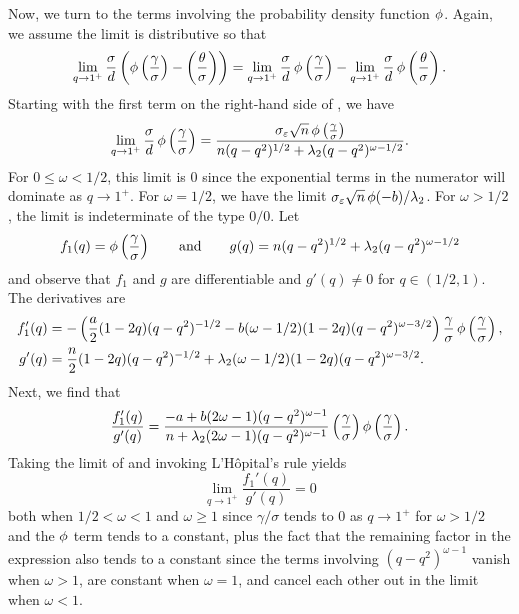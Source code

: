 Now, we turn to the terms involving the probability density function \(\operatorname{\phi}\). Again, we
assume the limit is distributive so that
\begin{equation}
  \label{eq:eval-qlimit-pdf-weighted}
  \lim_{q \rightarrow 1^+} \frac{\sigma}{d} \left(\operatorname{\phi}\left(\frac{\gamma}{\sigma}\right) - \left(\frac{\theta}{\sigma}\right)\right) =
  \lim_{q\rightarrow 1^+}\frac{\sigma}{d} \operatorname{\phi} \left(\frac{\gamma}{\sigma}\right) - \lim_{q \rightarrow 1^+} \frac{\sigma}{d} \operatorname{\phi} \left(\frac{\theta}{\sigma}\right).
\end{equation}
%
Starting with the first term on the right-hand side of ,
we have
%
\[
  \lim_{q\rightarrow 1^+}\frac{\sigma}{d} \operatorname{\phi} \left(\frac{\gamma}{\sigma}\right) =
  \frac{\sigma_\varepsilon \sqrt{n} \operatorname{\phi}\left(\frac{\gamma}{\sigma}\right)}{n(q-q^2)^{1/2} + \lambda_2(q-q^2)^{\omega - 1/2}}.
\]
For \(0 \leq \omega < 1/2\), this limit is 0 since the exponential terms in the numerator
will dominate as \(q \rightarrow 1^+\). For \(\omega = 1/2\), we have the limit
\(\sigma_\varepsilon\sqrt{n} \operatorname{\phi}(-b)/\lambda_2\). For \(\omega > 1/2\), the limit is
indeterminate of the type \(0/0\). Let
\begin{equation*}
  f_1(q) = \operatorname{\phi}\left(\frac{\gamma}{\sigma}\right)
  \qquad\text{and}\qquad
  g(q) = n(q-q^2)^{1/2} + \lambda_2(q-q^2)^{\omega - 1/2}
\end{equation*}
%
and observe that \(f_1\) and \(g\) are differentiable and \(g'(q) \neq 0 \) for \(q \in
(1/2, 1)\). The derivatives are
%
\begin{align*}
  f_1'(q) & = -\left(\frac{a}{2}(1-2q)(q-q^2)^{-1/2} - b(\omega - 1/2)(1-2q)(q-q^2)^{\omega - 3/2}\right) \frac{\gamma}{\sigma} \operatorname{\phi}\left(\frac{\gamma}{\sigma}\right), \\
  g'(q)   & = \frac{n}{2}(1-2q)(q-q^2)^{-1/2} + \lambda_2(\omega - 1/2)(1-2q)(q-q^2)^{\omega - 3/2}.
\end{align*}
%
Next, we find that
\begin{equation}
  \label{eq:eval-qlimit-pdf-derivative-weighted}
  \frac{f_1'(q)}{g'(q)} = \frac{-a + b(2\omega - 1)(q-q^2)^{\omega - 1}}{n + \lambda_2(2\omega - 1)(q-q^2)^{\omega - 1}} \left(\frac{\gamma}{\sigma}\right) \operatorname{\phi}\left(\frac{\gamma}{\sigma}\right).
\end{equation}
%
Taking the limit of  and invoking L'Hôpital's
rule yields
\[
  \lim_{q\rightarrow 1^+} \frac{f_1'(q)}{g'(q)} =0
\]
both when \(1/2 < \omega < 1\) and \(\omega \geq 1\) since \(\gamma/\sigma\) tends to 0 as
\(q \rightarrow 1^+\) for \(\omega > 1/2\) and the \(\operatorname{\phi}\) term tends to a constant, plus
the fact that the remaining factor in the expression also tends to a constant since the
terms involving \((q-q^2)^{\omega - 1}\) vanish when \(\omega > 1\), are constant when
\(\omega = 1\), and cancel each other out in the limit when \(\omega < 1\).

